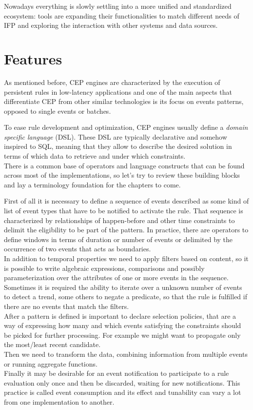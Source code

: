Nowadays everything is slowly settling into a more unified and standardized ecosystem: tools are expanding their functionalities to match different needs of IFP and exploring the interaction with other systems and data sources.

\section{Features}
As mentioned before, CEP engines are characterized by the execution of persistent rules in low-latency applications and one of the main aspects that differentiate CEP from other similar technologies is its focus on events patterns, opposed to single events or batches.

To ease rule development and optimization, CEP engines usually define a \emph{domain specific language} (DSL). These DSL are typically declarative and somehow inspired to SQL, meaning that they allow to describe the desired solution in terms of which data to retrieve and under which constraints.\\
There is a common base of operators and language constructs that can be found across most of the implementations, so let's try to review these building blocks and lay a terminology foundation for the chapters to come.

First of all it is necessary to define a sequence of events described as some kind of list of event types that have to be notified to activate the rule. That sequence is characterized by relationships of happen-before and other time constraints to delimit the eligibility to be part of the pattern. In practice, there are operators to define windows in terms of duration or number of events or delimited by the occurrence of two events that acts as boundaries.\\
In addition to temporal properties we need to apply filters based on content, so it is possible to write algebraic expressions, comparisons and possibly parameterization over the attributes of one or more events in the sequence.\\
Sometimes it is required the ability to iterate over a unknown number of events to detect a trend, some others to negate a predicate, so that the rule is fulfilled if there are no events that match the filters.\\
After a pattern is defined is important to declare selection policies, that are a way of expressing how many and which events satisfying the constraints should be picked for further processing. For example we might want to propagate only the most/least recent candidate.\\
Then we need to transform the data, combining information from multiple events or running aggregate functions.\\
Finally it may be desirable for an event notification to participate to a rule evaluation only once and then be discarded, waiting for new notifications. This practice is called event consumption and its effect and tunability can vary a lot from one implementation to another.

